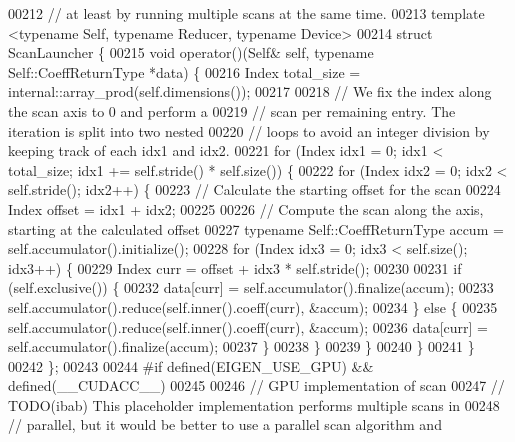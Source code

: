 \begin{DoxyCode}
00212 \textcolor{comment}{// at least by running multiple scans at the same time.}
00213 \textcolor{keyword}{template} <\textcolor{keyword}{typename} Self, \textcolor{keyword}{typename} Reducer, \textcolor{keyword}{typename} Device>
00214 \textcolor{keyword}{struct }ScanLauncher \{
00215   \textcolor{keywordtype}{void} operator()(Self& \textcolor{keyword}{self}, \textcolor{keyword}{typename} Self::CoeffReturnType *data) \{
00216     Index total\_size = internal::array\_prod(\textcolor{keyword}{self}.dimensions());
00217 
00218     \textcolor{comment}{// We fix the index along the scan axis to 0 and perform a}
00219     \textcolor{comment}{// scan per remaining entry. The iteration is split into two nested}
00220     \textcolor{comment}{// loops to avoid an integer division by keeping track of each idx1 and idx2.}
00221     \textcolor{keywordflow}{for} (Index idx1 = 0; idx1 < total\_size; idx1 += \textcolor{keyword}{self}.stride() * \textcolor{keyword}{self}.size()) \{
00222       \textcolor{keywordflow}{for} (Index idx2 = 0; idx2 < \textcolor{keyword}{self}.stride(); idx2++) \{
00223         \textcolor{comment}{// Calculate the starting offset for the scan}
00224         Index offset = idx1 + idx2;
00225 
00226         \textcolor{comment}{// Compute the scan along the axis, starting at the calculated offset}
00227         \textcolor{keyword}{typename} Self::CoeffReturnType accum = \textcolor{keyword}{self}.accumulator().initialize();
00228         \textcolor{keywordflow}{for} (Index idx3 = 0; idx3 < \textcolor{keyword}{self}.size(); idx3++) \{
00229           Index curr = offset + idx3 * \textcolor{keyword}{self}.stride();
00230 
00231           \textcolor{keywordflow}{if} (\textcolor{keyword}{self}.exclusive()) \{
00232             data[curr] = \textcolor{keyword}{self}.accumulator().finalize(accum);
00233             \textcolor{keyword}{self}.accumulator().reduce(\textcolor{keyword}{self}.inner().coeff(curr), &accum);
00234           \} \textcolor{keywordflow}{else} \{
00235             \textcolor{keyword}{self}.accumulator().reduce(\textcolor{keyword}{self}.inner().coeff(curr), &accum);
00236             data[curr] = \textcolor{keyword}{self}.accumulator().finalize(accum);
00237           \}
00238         \}
00239       \}
00240     \}
00241   \}
00242 \};
00243 
00244 \textcolor{preprocessor}{#if defined(EIGEN\_USE\_GPU) && defined(\_\_CUDACC\_\_)}
00245 
00246 \textcolor{comment}{// GPU implementation of scan}
00247 \textcolor{comment}{// TODO(ibab) This placeholder implementation performs multiple scans in}
00248 \textcolor{comment}{// parallel, but it would be better to use a parallel scan algorithm and}

\end{DoxyCode}
